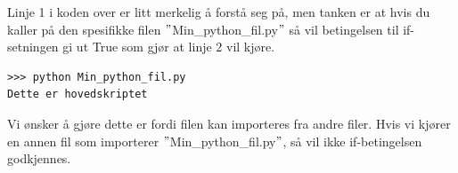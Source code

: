 Linje 1 i koden over er litt merkelig å forstå seg på, men tanken er at hvis du kaller på den spesifikke filen  $"$Min\_python\_fil.py$"$ så vil betingelsen til if-setningen gi ut True som gjør at linje 2 vil kjøre.

\begin{lstlisting}
>>> python Min_python_fil.py
Dette er hovedskriptet
\end{lstlisting}
 Vi ønsker å gjøre dette er fordi filen kan importeres fra andre filer. Hvis vi kjører en annen fil som importerer  $"$Min\_python\_fil.py$"$, så vil ikke if-betingelsen godkjennes.  

